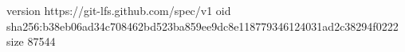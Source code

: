 version https://git-lfs.github.com/spec/v1
oid sha256:b38eb06ad34c708462bd523ba859ee9dc8e118779346124031ad2c38294f0222
size 87544
